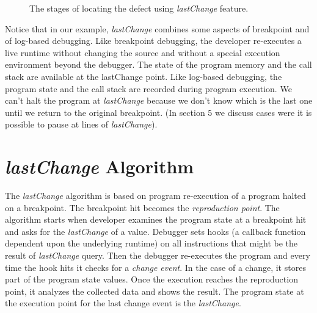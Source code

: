 \documentclass[preprint]{sigplanconf}
\begin{document}
\begin{figure}[htp]

\caption{The stages of locating the defect using \textit{lastChange} feature.}
\label{fig:lastChange}
\end{figure}


Notice that in our example, \textit{lastChange} combines some aspects
of breakpoint and of log-based debugging. Like breakpoint debugging,
the developer re-executes a live runtime without changing the source
and without a special execution environment beyond the debugger. The
state of the program memory and the call stack are available at the
lastChange point. Like log-based debugging, the program state and the
call stack are recorded during program execution. We can't halt the
program at \textit{lastChange} because we don't know which is the last
one until we return to the original breakpoint. (In section 5 we
discuss cases were it is possible to pause at lines of \textit{lastChange}).

\section{\textit{lastChange} Algorithm}

The \textit{lastChange} algorithm is based on program re-execution of
a program halted on a breakpoint. The breakpoint hit becomes the
\textit{reproduction point}. The algorithm starts when developer
examines the program state at a breakpoint hit and asks for the
\textit{lastChange} of a value.  Debugger sets hooks (a callback
function dependent upon the underlying runtime) on all instructions
that might be the result of \textit{lastChange} query. Then the
debugger re-executes the program and every time the hook hits it
checks for a \textit{change event}. In the case of a change, it stores
part of the program state values.  Once the execution reaches the
reproduction point, it analyzes the collected data and shows the
result.  The program state at the execution point for the last change
event is the \textit{lastChange}.
\end{document}
